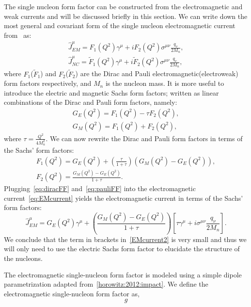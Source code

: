 The single nucleon form factor can be constructed from the electromagnetic and weak currents and will be discussed briefly in this section. We can write down the most general and covariant form of the single nucleon electromagnetic current from~\cite{horowitz:2012:impact} as:
\begin{gather}
\hat{J}^{\mu}_{EM} = F_1(Q^2)\gamma ^{\mu} +iF_2(Q^2)\sigma ^{\mu \nu}\frac{q_{\nu}}{2M_n},\label{eq:EMcurrent} \\
\hat{J}^{\mu}_{NC} = \tilde{F}_1(Q^2)\gamma ^{\mu} +i\tilde{F}_2(Q^2)\sigma ^{\mu \nu}\frac{q_{\nu}}{2M_n},
\end{gather}
where $F_1$($\tilde{F}_1$) and $F_2$($\tilde{F}_2$) are the Dirac and Pauli electromagnetic(electroweak) form factors respectively, and $M_n$ is the nucleon mass. It is more useful to introduce the electric and magnetic Sachs form factors; written as linear combinations of the Dirac and Pauli form factors, namely:
\begin{gather}
G_E(Q^2)=F_1(Q^2)-\tau F_2(Q^2), \\
G_M(Q^2)=F_1(Q^2)+F_2(Q^2),
\end{gather}
where $\tau = \frac{Q^2}{4M_n^2}$. We can now rewrite the Dirac and Pauli form factors in terms of the Sachs' form factors:
\begin{gather}
F_1(Q^2)=G_E(Q^2) + \left( \frac{\tau}{1+\tau} \right)(G_M(Q^2) - G_E(Q^2)),\label{eq:diracFF} \\
F_2(Q^2)=\frac{G_M(Q^2)-G_E(Q^2)}{1+\tau}.\label{eq:pauliFF}
\end{gather} 
Plugging~\eqref{eq:diracFF} and~\eqref{eq:pauliFF} into the electromagnetic current~\eqref{eq:EMcurrent} yields the electromagnetic current in terms of the Sachs' form factors:
\begin{equation}
\hat{J}^{\mu}_{EM}=G_E(Q^2)\gamma ^{\mu} + \left( \frac{G_M(Q^2)-G_E(Q^2)}{1+\tau} \right) \left[ \tau \gamma ^{\mu} + i\sigma^{\mu \nu} \frac{q_{\nu}}{2M_n} \right].\label{EMcurrent2}
\end{equation}
We conclude that the term in brackets in~\eqref{EMcurrent2} is very small and thus we will only need to use the electric Sachs form factor to elucidate the structure of the nucleons. 

The electromagnetic single-nucleon form factor is modeled using a simple dipole parametrization adapted from~\ref{horowitz:2012:impact}. We define the electromagnetic single-nucleon form factor as,
\begin{equation}
g
\end{equation}
 


